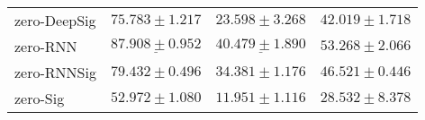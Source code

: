 \begin{tabular}{llll}
\midrule
zero-DeepSig   &                           $ 75.783 \pm 1.217 $ &                           $ 23.598 \pm 3.268 $ &                           $ 42.019 \pm 1.718 $ \\
zero-RNN       &            $  \underline{ 87.908 \pm 0.952 } $ &            $  \underline{ 40.479 \pm 1.890 } $ &                           $ 53.268 \pm 2.066 $ \\
zero-RNNSig    &                           $ 79.432 \pm 0.496 $ &                           $ 34.381 \pm 1.176 $ &                           $ 46.521 \pm 0.446 $ \\
zero-Sig       &                           $ 52.972 \pm 1.080 $ &                           $ 11.951 \pm 1.116 $ &                           $ 28.532 \pm 8.378 $ \\
\bottomrule
\end{tabular}
